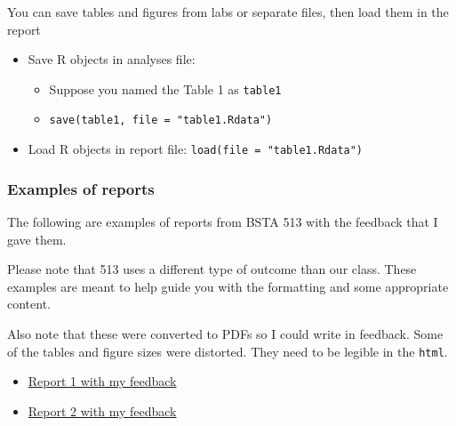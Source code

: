 \documentclass[
  letterpaper,
  DIV=11,
  numbers=noendperiod]{scrartcl}
\providecommand{\tightlist}{%
  \setlength{\itemsep}{0pt}\setlength{\parskip}{0pt}}\usepackage{longtable,booktabs,array}
\begin{document}
\begin{tcolorbox}[enhanced jigsaw, toprule=.15mm, left=2mm, toptitle=1mm, leftrule=.75mm, arc=.35mm, colback=white, opacityback=0, coltitle=black, breakable, colframe=quarto-callout-note-color-frame, title=\textcolor{quarto-callout-note-color}{\faInfo}\hspace{0.5em}{The project report is a separate file from the labs}, colbacktitle=quarto-callout-note-color!10!white, bottomrule=.15mm, opacitybacktitle=0.6, bottomtitle=1mm, rightrule=.15mm, titlerule=0mm]

You can save tables and figures from labs or separate files, then load
them in the report

\begin{itemize}
\tightlist
\item
  Save R objects in analyses file:

  \begin{itemize}
  \tightlist
  \item
    Suppose you named the Table 1 as \texttt{table1}
  \item
    \texttt{save(table1,\ file\ =\ "table1.Rdata")}
  \end{itemize}
\item
  Load R objects in report file: \texttt{load(file\ =\ "table1.Rdata")}
\end{itemize}

\end{tcolorbox}

\hypertarget{examples-of-reports}{%
\subsubsection{Examples of reports}\label{examples-of-reports}}

The following are examples of reports from BSTA 513 with the feedback
that I gave them.

Please note that 513 uses a different type of outcome than our class.
These examples are meant to help guide you with the formatting and some
appropriate content.

Also note that these were converted to PDFs so I could write in
feedback. Some of the tables and figure sizes were distorted. They need
to be legible in the \texttt{html}.

\begin{itemize}
\item
  \href{https://ohsuitg-my.sharepoint.com/:b:/r/personal/wakim_ohsu_edu/Documents/Teaching/Classes/W2024_BSTA_512_612/Student_files/Project_examples/Group_09_Report.pdf?csf=1\&web=1\&e=54lAbD}{Report
  1 with my feedback}
\item
  \href{https://ohsuitg-my.sharepoint.com/:b:/r/personal/wakim_ohsu_edu/Documents/Teaching/Classes/W2024_BSTA_512_612/Student_files/Project_examples/Group_07_Report.pdf?csf=1\&web=1\&e=uWHgnB}{Report
  2 with my feedback}
\end{itemize}
\end{document}
